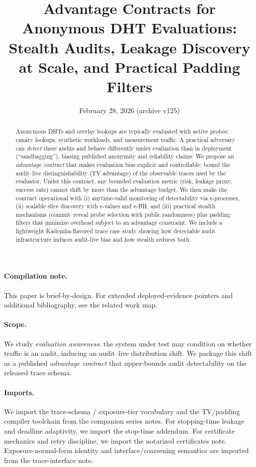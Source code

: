 \documentclass[11pt]{article}
\title{Advantage Contracts for Anonymous DHT Evaluations:\\
Stealth Audits, Leakage Discovery at Scale, and Practical Padding Filters}
\author{}
\date{February 28, 2026 (archive v125)}
\begin{document}
\maketitle

\begin{abstract}
Anonymous DHTs and overlay lookups are typically evaluated with active probes: canary lookups, synthetic workloads, and measurement traffic.
A practical adversary can \emph{detect} these audits and behave differently under evaluation than in deployment (``sandbagging''),
biasing published anonymity and reliability claims.
We propose an \emph{advantage contract} that makes evaluation bias explicit and controllable:
bound the audit--live distinguishability (TV advantage) of the observable traces used by the evaluator.
Under this contract, any bounded evaluation metric (risk, leakage proxy, success rate) cannot shift by more than the advantage budget.
We then make the contract operational with (i) anytime-valid monitoring of detectability via e-processes, (ii) scalable slice discovery with e-values and e-BH,
and (iii) practical stealth mechanisms (commit--reveal probe selection with public randomness) plus padding filters that minimize overhead subject to an advantage constraint.
We include a lightweight Kademlia-flavored trace case study showing how detectable audit infrastructure induces audit-live bias and how stealth reduces both.
\end{abstract}

\paragraph{Compilation note.}
This paper is brief-by-design. For extended deployed-evidence pointers and additional bibliography, see the related work map.\cite{series:relatedwork}

\paragraph{Scope.}
We study \emph{evaluation awareness}: the system under test may condition on whether traffic is an audit, inducing an audit--live distribution shift.
We package this shift as a published \emph{advantage contract} that upper-bounds audit detectability on the released trace schema.

\paragraph{Imports.}
We import the trace-schema / exposure-tier vocabulary and the TV/padding compiler toolchain from the companion series notes.\cite{series:schedcompiler,series:knapsacktransport}
For stopping-time leakage and deadline adaptivity, we import the stop-time addendum.\cite{series:stoptimeaddendum}
For certificate mechanics and retry discipline, we import the notarized certificates note.\cite{series:evalnotary}
Exposure-normal-form identity and interface/coarsening semantics are imported from the trace-interface note.\cite{series:traceifaces}
\end{document}
